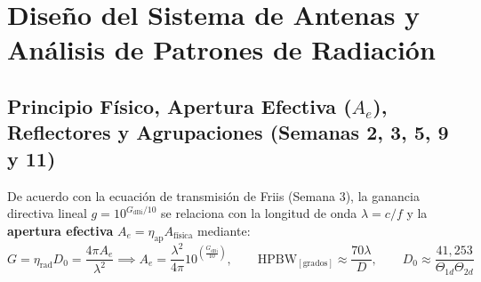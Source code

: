 \documentclass[10pt,letterpaper]{article}
\begin{document}
\newpage
\section{Diseño del Sistema de Antenas y Análisis de Patrones de Radiación}

\subsection{Principio Físico, Apertura Efectiva ($A_e$), Reflectores y Agrupaciones (Semanas 2, 3, 5, 9 y 11)}
De acuerdo con la ecuación de transmisión de Friis (Semana 3), la ganancia directiva lineal $g = 10^{G_{\text{dBi}}/10}$ se relaciona con la longitud de onda $\lambda = c/f$ y la \textbf{apertura efectiva} $A_e = \eta_{\text{ap}} A_{\text{física}}$ mediante:
\begin{equation}
    G = \eta_{\text{rad}} D_0 = \frac{4\pi A_e}{\lambda^2} \implies A_e = \frac{\lambda^2}{4\pi} 10^{\left(\frac{G_{\text{dBi}}}{10}\right)}, \qquad \text{HPBW}_{[\text{grados}]} \approx \frac{70\lambda}{D}, \qquad D_0 \approx \frac{41,253}{\Theta_{1d}\Theta_{2d}}
    \label{eq:antenas_base}
\end{equation}
\end{document}

